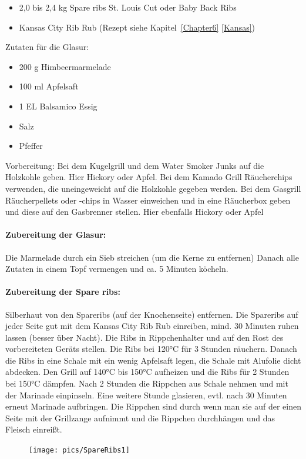\begin{itemize}[noitemsep]
	\item 2,0 bis 2,4 kg Spare ribs St. Louis Cut oder Baby Back Ribs
	\item Kansas City Rib Rub (Rezept siehe Kapitel~\ref{Chapter6} 
	\vref{Kansas})
\end{itemize}

Zutaten für die Glasur:
\begin{itemize}[noitemsep]
	\item 200 g Himbeermarmelade
	\item 100 ml Apfelsaft
	\item 1 EL Balsamico Essig
	\item Salz
	\item Pfeffer	
\end{itemize}

Vorbereitung: Bei dem Kugelgrill und dem Water Smoker Junks auf die Holzkohle geben. Hier Hickory oder Apfel.
Bei dem Kamado Grill Räucherchips verwenden, die uneingeweicht auf die Holzkohle gegeben werden.
Bei dem Gasgrill Räucherpellets oder -chips in Wasser einweichen und in 
eine Räucherbox geben und diese auf den Gasbrenner stellen. Hier 
ebenfalls Hickory oder Apfel

\paragraph{Zubereitung der Glasur:}

Die Marmelade durch ein Sieb streichen (um die Kerne zu entfernen) 
Danach alle Zutaten in einem Topf vermengen und ca. 5 Minuten köcheln.

\paragraph{Zubereitung der Spare ribs:}

Silberhaut von den Spareribs (auf der Knochenseite) entfernen.
Die Spareribs auf jeder Seite gut mit dem Kansas City Rib Rub einreiben, 
mind. 30 Minuten ruhen lassen (besser über Nacht).
Die Ribs in Rippchenhalter und auf den Rost des vorbereiteten 
Geräts stellen.
Die Ribs bei 120°C für 3 Stunden räuchern. Danach die Ribs in eine 
Schale mit ein wenig Apfelsaft legen, die Schale mit Alufolie dicht 
abdecken. Den Grill auf 140°C bis 150°C aufheizen und die Ribs für 2 
Stunden bei 150°C dämpfen.
Nach 2 Stunden die Rippchen aus Schale nehmen und mit der Marinade 
einpinseln. Eine weitere Stunde glasieren, evtl. nach 30 Minuten erneut 
Marinade aufbringen.
Die Rippchen sind durch wenn man sie auf der einen Seite mit der 
Grillzange aufnimmt und die Rippchen durchhängen und das Fleisch 
einreißt. 
\newpage
\begin{figure}[htbp]
			\centering
		\begin{minipage}{1\textwidth}
		\centering
		\texttt{[image: pics/SpareRibs1]}
		\label{fig:Spare}
		\end{minipage}
\end{figure}
\newpage

